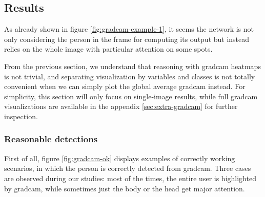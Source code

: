 \subsection{Results}
\label{subsec:gradcam-results}

As already shown in figure \ref{fig:gradcam-example-1}, it seems the network is not only considering the person in the frame for computing its output but instead relies on the whole image with particular attention on some spots.

From the previous section, we understand that reasoning with \gls{gradcam} heatmaps is not trivial, and separating visualization by variables and classes is not totally convenient when we can simply plot the global average \gls{gradcam} instead. For simplicity, this section will only focus on single-image results, while full \gls{gradcam} visualizations are available in the appendix \ref{sec:extra-gradcam} for further inspection.

\subsubsection*{Reasonable detections}

First of all, figure \ref{fig:gradcam-ok} displays examples of correctly working scenarios, in which the person is correctly detected from \gls{gradcam}. Three cases are observed during our studies: most of the times, the entire user is highlighted by \gls{gradcam}, while sometimes just the body or the head get major attention.

